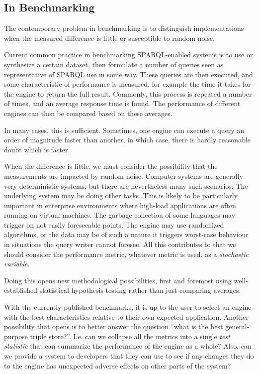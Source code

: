 \documentclass{llncs}
\begin{document}
\subsection{In Benchmarking}

The contemporary problem in benchmarking is to distinguish
implementations when the measured difference is little or susceptible
to random noise.

Current common practice in benchmarking SPARQL-enabled systems is to
use or synthesize a certain dataset, then formulate a number of
queries seen as representative of SPARQL use in some way. These
queries are then executed, and some characteristic of performance is
measured, for example the time it takes for the engine to return the
full result. Commonly, this process is repeated a number of times, and
an average response time is found. The performance of different
engines can then be compared based on these averages.

In many cases, this is sufficient. Sometimes, one engine can execute a
query an order of magnitude faster than another, in which case, there
is hardly reasonable doubt which is faster.

When the difference is little, we must consider the possibility that
the measurements are impacted by random noise. Computer systems are
generally very deterministic systems, but there are nevertheless many
such scenarios: The underlying system may be doing other tasks. This
is likely to be particularly important in enterprise environments
where high-load applications are often running on virtual
machines. The garbage collection of some languages may trigger on not
easily foreseeable points. The engine may use randomized algorithms,
or the data may be of such a nature it triggers worst-case behaviour
in situations the query writer cannot foresee. All this contributes to
that we should consider the performance metric, whatever metric is
used, as a \emph{stochastic variable}.

Doing this opens new methodological possibilities, first and foremost
using well-established statistical hypothesis testing rather than just
comparing averages. 

With the currently published benchmarks, it is up to the user to
select an engine with the best characteristics relative to their own
expected application. Another possibility that opens is to better
answer the question ``what is the best general-purpose triple
store?''. I.e. can we collapse all the metrics into a single
\emph{test statistic} that can summarize the performance of the engine
as a whole? Also, can we provide a system to developers that they can
use to see if any changes they do to the engine has unexpected adverse
effects on other parts of the system?
\end{document}
